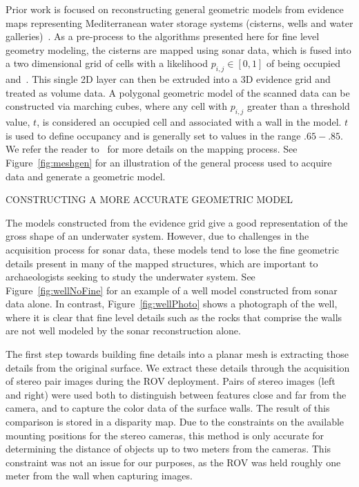 \documentclass[twocolumn]{article}
\makeatletter
\def\section{\@startsection{section}{1}{\z@}{24pt plus 2 pt
minus 2 pt} {12pt plus 2pt minus 2pt}{\large\bf}}
\makeatother
\begin{document}
Prior work is focused on reconstructing general geometric models from evidence maps representing Mediterranean water storage systems (cisterns, wells and water galleries)~\cite{ICEX11,McVicker,McVicker2}. As a pre-process to the algorithms presented here for fine level geometry modeling, the cisterns are mapped using sonar data, which is fused into a two dimensional grid of cells with a likelihood $p_{i,j} \in [0,1]$ of being occupied \cite{Thrun2005} and~\cite{White10}. This single 2D layer can then be extruded into a 3D evidence grid and treated as volume data. A polygonal geometric model of the scanned data can be constructed via marching cubes, where any cell with $p_{i,j}$ greater than a threshold value, $t$, is considered an occupied cell and associated with a wall in the model. $t$ is used to define occupancy and is generally set to values in the range $.65-.85$. We refer the reader to~\cite{ICEX11,McVicker,McVicker2} for more details on the mapping process. See Figure~\ref{fig:meshgen} for an illustration of the general process used to acquire data and generate a geometric model.

\section{\uppercase{Constructing a more accurate geometric model}}
\label{sec:detail}

\noindent The models constructed from the evidence grid give a good representation of the gross shape of an underwater system. However, due to challenges in the acquisition process for sonar data, these models tend to lose the fine geometric details present in many of the mapped structures, which are important to archaeologists seeking to study the underwater system. See Figure~\ref{fig:wellNoFine} for an example of a well model constructed from sonar data alone. In contrast, Figure~\ref{fig:wellPhoto} shows a photograph of the well, where it is clear that fine level details such as the rocks that comprise the walls are not well modeled by the sonar reconstruction alone.

The first step towards building fine details into a planar mesh is extracting those details from the original surface. We extract these details through the acquisition of stereo pair images during the ROV deployment. Pairs of stereo images (left and right) were used both to distinguish between features close and far from the camera, and to capture the color data of the surface walls.
The result of this comparison is stored in a disparity map. Due to the constraints on the available mounting positions for the stereo cameras, this method is only accurate for determining the distance of objects up to two meters from the cameras. This constraint was not an issue for our purposes, as the ROV was held roughly one meter from the wall when capturing images.
\end{document}
